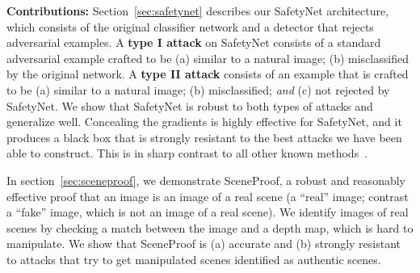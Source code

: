 \documentclass[10pt,twocolumn,letterpaper]{article}
\begin{document}

{\bf Contributions:} 
Section~\ref{sec:safetynet} describes our SafetyNet architecture, which consists of  the original classifier network and
 a detector that rejects adversarial examples.
A \textbf{type I attack} on SafetyNet consists of a standard adversarial example crafted to be (a)
similar to a natural image; (b) misclassified by the original network.  A \textbf{type II attack} consists of an example
that is crafted to be (a) similar to a natural image; (b) misclassified; {\em and} (c) not rejected by SafetyNet.  We
show that SafetyNet is robust to both types of attacks and generalize well. Concealing the gradients is highly effective 
for SafetyNet, and it produces a black box that is strongly resistant to the best attacks we have been able to construct. 
This is in sharp contrast to all other known methods~\cite{papernot2016practical, metzen2017detecting}.

In section~\ref{sec:sceneproof}, we demonstrate SceneProof, a robust and reasonably
effective proof that an image is an image of a real scene (a ``real'' image; contrast a ``fake'' image, which is not an
image of a real scene).   We identify images of real scenes by checking a match between the image and a depth map, which is hard to manipulate. 
We show that SceneProof is (a) accurate and (b) strongly resistant to attacks that try to get manipulated
scenes identified as authentic scenes.
\end{document}
